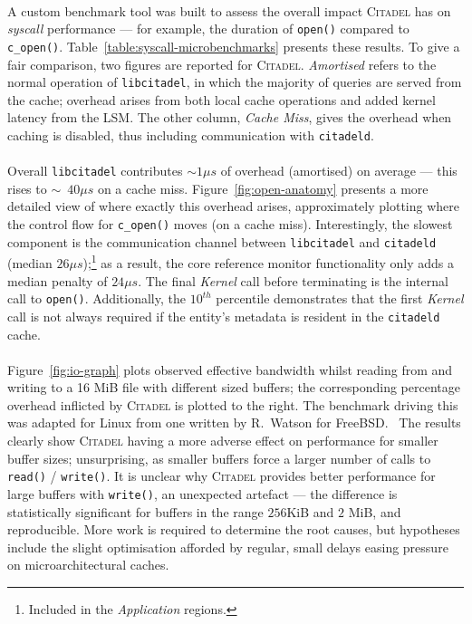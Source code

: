 \paragraph{} A custom benchmark tool was built to assess the overall impact \textsc{Citadel} has on \textit{syscall} performance --- for example, the duration of \texttt{open()} compared to \texttt{c\_open()}. Table~\ref{table:syscall-microbenchmarks} presents these results. To give a fair comparison, two figures are reported for \textsc{Citadel}. \textit{Amortised} refers to the normal operation of \texttt{libcitadel}, in which the majority of queries are served from the cache; overhead arises from both local cache operations and added kernel latency from the LSM. The other column, \textit{Cache Miss}, gives the overhead when caching is disabled, thus including communication with \texttt{citadeld}.

\paragraph{} Overall \texttt{libcitadel} contributes $\sim{}1 \mu s$ of overhead (amortised) on average --- this rises to $\sim$~$40 \mu s$ on a cache miss. Figure~\ref{fig:open-anatomy} presents a more detailed view of where exactly this overhead arises, approximately plotting where the control flow for \texttt{c\_open()} moves (on a cache miss). Interestingly, the slowest component is the communication channel between \texttt{libcitadel} and \texttt{citadeld} (median $26\mu s$);\footnote{Included in the \textit{Application} regions.} as a result, the core reference monitor functionality only adds a median penalty of $24\mu s$. The final \textit{Kernel} call before terminating is the internal call to \texttt{open()}. Additionally, the $10^{th}$ percentile demonstrates that the first \textit{Kernel} call is not always required if the entity's metadata is resident in the \texttt{citadeld} cache.

\paragraph{} Figure~\ref{fig:io-graph} plots observed effective bandwidth whilst reading from and writing to a 16 MiB file with different sized buffers; the corresponding percentage overhead inflicted by \textsc{Citadel} is plotted to the right. The benchmark driving this was adapted for Linux from one written by R.~Watson for FreeBSD.~\cite{l41-benchmark} The results clearly show \textsc{Citadel} having a more adverse effect on performance for smaller buffer sizes; unsurprising, as smaller buffers force a larger number of calls to \texttt{read()} / \texttt{write()}. It is unclear why \textsc{Citadel} provides better performance for large buffers with \texttt{write()}, an unexpected artefact --- the difference is statistically significant for buffers in the range $256$KiB and $2$ MiB, and reproducible. More work is required to determine the root causes, but hypotheses include the slight optimisation afforded by regular, small delays easing pressure on microarchitectural caches.



